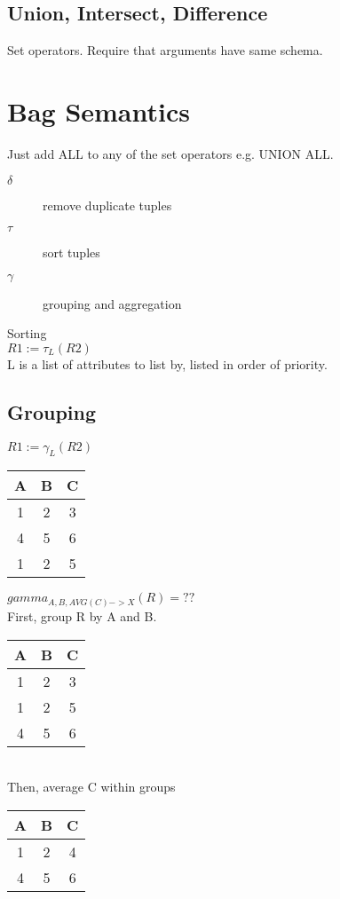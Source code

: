 \documentclass[12pt]{article}
\begin{document}
\subsection{Union, Intersect, Difference}
Set operators. Require that arguments have same schema. 

\section{Bag Semantics}
Just add ALL to any of the set operators e.g. UNION ALL.
\begin{description}
  \item[$\delta$]{remove duplicate tuples}
  \item[$\tau$]{sort tuples}
  \item[$\gamma$]{grouping and aggregation}
\end{description}

Sorting\\
$R1 := \tau_L(R2)$\\
L is a list of attributes to list by, listed in order of priority.

\subsection{Grouping}
$R1 := \gamma_L(R2)$\\
\begin{tabular}{|c|c|c|}
  \hline
  A & B & C\\
  \hline
  1 & 2 & 3\\
  \hline
  4 & 5 & 6\\
  \hline
  1 & 2 & 5\\
  \hline
\end{tabular}
$gamma_{A,B,AVG(C)->X}(R) = ??$\\
First, group R by A and B.\\ 
\begin{tabular}{|c|c|c|}
  \hline
  A & B & C\\
  \hline
  1 & 2 & 3\\
  \hline
  1 & 2 & 5\\
  \hline
  4 & 5 & 6\\
  \hline
\end{tabular}\\
Then, average C within groups\\
\begin{tabular}{|c|c|c|}
  \hline
  A & B & C\\
  \hline
  1 & 2 & 4\\
  \hline
  4 & 5 & 6\\
  \hline
\end{tabular}
\end{document}
